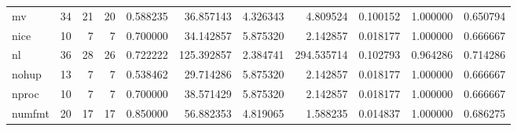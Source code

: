 \begin{tabular}{lrrrrrrrrrr}
mv        &                                      34 &                 21 &                                20 &                                   0.588235 &                              36.857143 &                                     4.326343 &                          4.809524 &                                0.100152 &                           1.000000 &                                           0.650794 \\
nice      &                                      10 &                  7 &                                 7 &                                   0.700000 &                              34.142857 &                                     5.875320 &                          2.142857 &                                0.018177 &                           1.000000 &                                           0.666667 \\
nl        &                                      36 &                 28 &                                26 &                                   0.722222 &                             125.392857 &                                     2.384741 &                        294.535714 &                                0.102793 &                           0.964286 &                                           0.714286 \\
nohup     &                                      13 &                  7 &                                 7 &                                   0.538462 &                              29.714286 &                                     5.875320 &                          2.142857 &                                0.018177 &                           1.000000 &                                           0.666667 \\
nproc     &                                      10 &                  7 &                                 7 &                                   0.700000 &                              38.571429 &                                     5.875320 &                          2.142857 &                                0.018177 &                           1.000000 &                                           0.666667 \\
numfmt    &                                      20 &                 17 &                                17 &                                   0.850000 &                              56.882353 &                                     4.819065 &                          1.588235 &                                0.014837 &                           1.000000 &                                           0.686275 \\

\end{tabular}
